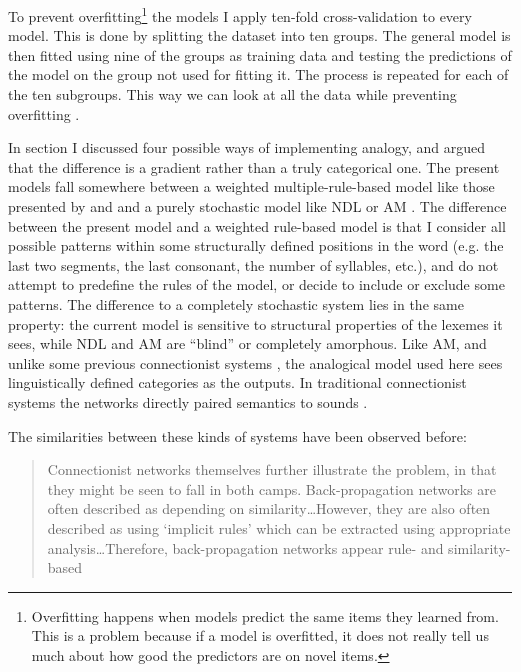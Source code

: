 To prevent overfitting\footnote{Overfitting happens when models predict the same items they learned from. This is a problem because if a model is overfitted, it does not really tell us much about how good the predictors are on novel items.} the models I apply ten-fold cross-validation to every model. This is done by splitting the dataset into ten groups. The general model is then fitted using nine of the groups as training data and testing the predictions of the model on the group not used for fitting it. The process is repeated for each of the ten subgroups. This way we can look at all the data while preventing  overfitting \autocite{Kohavi.1995}.

In section  I discussed four possible ways of implementing analogy, and argued that the difference is a gradient rather than a truly categorical one. The present models fall somewhere between a weighted multiple-rule-based model like those presented by \textcite{Albright.2003} and \textcite{Albright.2009} and a purely stochastic model like NDL \autocites{Arppe.2014, Baayen.2011, Baayen.2011a} or AM \autocites{Skousen.1989, Skousen.2002, Skousen.2013, Arndt-Lappe.2011, Arndt-Lappe.2014}. The difference between the present model and a weighted rule-based model is that I consider all possible patterns within some structurally defined positions in the word (e.g. the last two segments, the last consonant, the number of syllables, etc.), and do not attempt to predefine the rules of the model, or decide to include or exclude some patterns. The difference to a completely stochastic system lies in the same property: the current model is sensitive to structural properties of the lexemes it sees, while NDL and AM are ``blind'' or completely amorphous. Like AM, and unlike some previous connectionist systems \autocite{Bechtel.2002, Churchland.1989, McClelland.1986, Rumelhart.1986}, the analogical model used here sees linguistically defined categories as the outputs. In traditional connectionist systems the networks directly paired semantics to sounds \autocite{Matthews.2005}.

The similarities between these kinds of systems have been observed before:

\begin{quotation}
Connectionist  networks  themselves  further  illustrate  the  problem,  in  that  they might be seen to fall in both camps. Back-propagation networks are often described as  depending  on  similarity\dots  However,  they  are  also often described as using ‘implicit rules’ which can be extracted using appropriate analysis\dots Therefore, back-propagation networks appear rule- and similarity-based \autocite[p. 200]{Hahn.1998}
\end{quotation}

